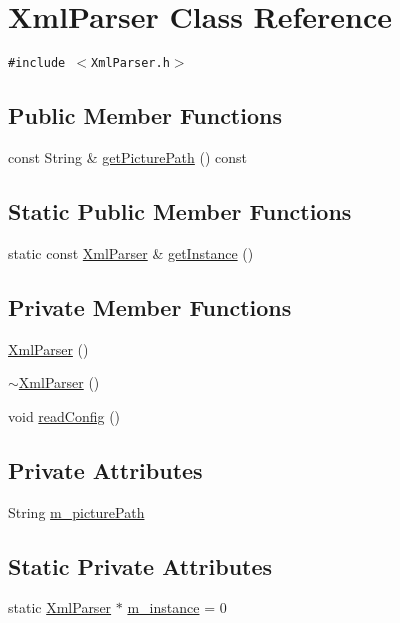 \hypertarget{class_xml_parser}{
\section{XmlParser Class Reference}
\label{class_xml_parser}
}
{\tt \#include $<$XmlParser.h$>$}

\subsection*{Public Member Functions}
\begin{CompactItemize}
\item 
const String \& \hyperlink{class_xml_parser_a19caec11bd5e78884329d7cb5571409}{getPicturePath} () const 
\end{CompactItemize}
\subsection*{Static Public Member Functions}
\begin{CompactItemize}
\item 
static const \hyperlink{class_xml_parser}{XmlParser} \& \hyperlink{class_xml_parser_bceee41ee0f57113f981d57f065a5e21}{getInstance} ()
\end{CompactItemize}
\subsection*{Private Member Functions}
\begin{CompactItemize}
\item 
\hyperlink{class_xml_parser_c77b14a84c93a07288b7dcd9d3a17397}{XmlParser} ()
\item 
\hyperlink{class_xml_parser_e3078c5ea3b5c79258a92513b55d8511}{$\sim$XmlParser} ()
\item 
void \hyperlink{class_xml_parser_0304f0ee335be7eb3182a13bc25a3323}{readConfig} ()
\end{CompactItemize}
\subsection*{Private Attributes}
\begin{CompactItemize}
\item 
String \hyperlink{class_xml_parser_74959bf42375b37dea6b6f32e96bfa33}{m\_\-picturePath}
\end{CompactItemize}
\subsection*{Static Private Attributes}
\begin{CompactItemize}
\item 
static \hyperlink{class_xml_parser}{XmlParser} $\ast$ \hyperlink{class_xml_parser_bc042bdcf4cd5409a58f1390d90ed98c}{m\_\-instance} = 0
\end{CompactItemize}


